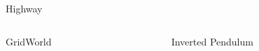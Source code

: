 \documentclass[xcolor=x11names,12pt]{beamer}
\begin{document}
\begin{frame}
\begin{columns}
\begin{column}{.48\textwidth}
\begin{block}{Highway}
      \end{block}
    \end{column}
  \end{columns}
  \begin{columns}
    \begin{column}{.48\textwidth}
      \begin{block}{GridWorld}
        \centering
        \fontsize{11pt}{11pt}\selectfont
      \end{block}
    \end{column}
    \begin{column}{.48\textwidth}
      \begin{block}{Inverted Pendulum}
        \centering
        \fontsize{11pt}{11pt}\selectfont
      \end{block}
    \end{column}
  \end{columns}



\end{frame}
\end{document}
